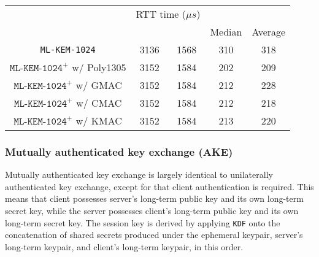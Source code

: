 \documentclass[journal=tches,submission]{iacrtrans}
\newcommand{\us}{\mu s}
\begin{document}
\begin{table}[H]
\begin{tabular}{|c|c|c|c|c|}
        & \multicolumn{2}{|c|}{RTT time ($\us$)} \\
        \cline{4-5}
        & & & Median & Average \\
        \hline
        \texttt{ML-KEM-1024} & 3136 & 1568 & 310 & 318 \\
        \hline
        $\texttt{ML-KEM-1024}^+$ w/ Poly1305 & 3152 & 1584 & 202 & 209 \\
        \hline
        $\texttt{ML-KEM-1024}^+$ w/ GMAC & 3152 & 1584 & 212 & 228 \\
        \hline
        $\texttt{ML-KEM-1024}^+$ w/ CMAC & 3152 & 1584 & 212 & 218 \\
        \hline
        $\texttt{ML-KEM-1024}^+$ w/ KMAC & 3152 & 1584 & 213 & 220 \\
        \hline
    \end{tabular}
\end{table}

\subsubsection{Mutually authenticated key exchange (AKE)}\label{sec:akex}
Mutually authenticated key exchange is largely identical to unilaterally authenticated key exchange, except for that client authentication is required. This means that client possesses server's long-term public key and its own long-term secret key, while the server possesses client's long-term public key and its own long-term secret key. The session key is derived by applying \texttt{KDF} onto the concatenation of shared secrets produced under the ephemeral keypair, server's long-term keypair, and client's long-term keypair, in this order.
\end{document}
